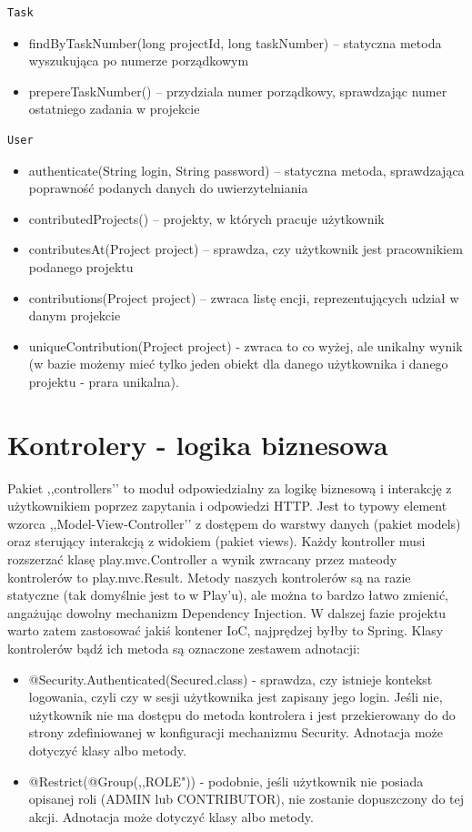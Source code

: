 \documentclass[a4paper,12pt,notitlepage]{mwrep}
\begin{document}
\begin{verbatim}Task\end{verbatim}
\begin{itemize}
	\item	findByTaskNumber(long projectId, long taskNumber) -- statyczna metoda wyszukująca po numerze porządkowym
	\item	prepereTaskNumber() -- przydziala numer porządkowy, sprawdzając numer ostatniego zadania w projekcie
\end{itemize}

\begin{verbatim}User\end{verbatim}
\begin{itemize}
	\item	authenticate(String login, String password) -- statyczna metoda, sprawdzająca poprawność podanych danych do uwierzytelniania
	\item	contributedProjects() -- projekty, w których pracuje użytkownik
	\item	contributesAt(Project project) -- sprawdza, czy użytkownik jest pracownikiem podanego projektu
	\item	contributions(Project project) -- zwraca listę encji, reprezentujących udział w danym projekcie
	\item	uniqueContribution(Project project) - zwraca to co wyżej, ale unikalny wynik (w bazie możemy mieć tylko jeden obiekt dla danego 
		użytkownika i danego projektu - prara unikalna).
\end{itemize}

\section{Kontrolery - logika biznesowa}

Pakiet ,,controllers’’ to moduł odpowiedzialny za logikę biznesową i interakcję z użytkownikiem poprzez zapytania i odpowiedzi HTTP.
Jest to typowy element wzorca ,,Model-View-Controller’’ z dostępem do warstwy danych (pakiet models)
oraz sterujący interakcją z widokiem (pakiet views).
Każdy kontroller musi rozszerzać klasę play.mvc.Controller a wynik zwracany przez mateody
kontrolerów to play.mvc.Result.
Metody naszych kontrolerów są na razie statyczne (tak domyślnie jest to w Play’u), ale można
to bardzo łatwo zmienić, angażując dowolny mechanizm Dependency Injection.
W dalszej fazie projektu warto zatem zastosować jakiś kontener IoC, najprędzej byłby to Spring.
Klasy kontrolerów bądź ich metoda są oznaczone zestawem adnotacji:
\begin{itemize}
    \item    @Security.Authenticated(Secured.class) - sprawdza, czy istnieje kontekst logowania,
czyli czy w sesji użytkownika jest zapisany jego login. Jeśli nie, użytkownik nie ma dostępu
do metoda kontrolera i jest przekierowany do do strony zdefiniowanej w konfiguracji
mechanizmu Security. Adnotacja może dotyczyć klasy albo metody.
\item    @Restrict(@Group(,,ROLE")) - podobnie, jeśli użytkownik nie posiada opisanej
    roli (ADMIN lub CONTRIBUTOR), nie zostanie dopuszczony do tej akcji.
    Adnotacja może dotyczyć klasy albo metody.
\end{itemize}
\end{document}
